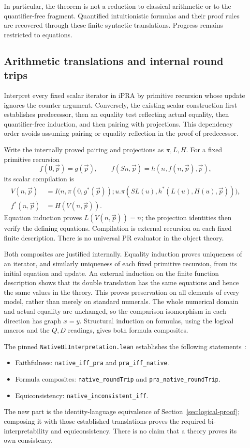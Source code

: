 \documentclass[11pt]{article}
\theoremstyle{definition}
\theoremstyle{remark}
\begin{document}
In particular, the theorem is not a reduction to classical arithmetic
or to the quantifier-free fragment. Quantified intuitionistic formulas
and their proof rules are recovered through these finite syntactic
translations. Progress remains restricted to equations.

\subsection{Arithmetic translations and internal round trips}

Interpret every fixed scalar iterator in iPRA by primitive recursion
whose update ignores the counter argument. Conversely, the existing
scalar construction first establishes predecessor, then an equality
test reflecting actual equality, then quantifier-free induction, and
then pairing with projections. This dependency order avoids assuming
pairing or equality reflection in the proof of predecessor.

Write the internally proved pairing and projections as $\pi,L,H$.
For a fixed primitive recursion
\[
 f(0,\vec p)=g(\vec p),\qquad
 f(Sn,\vec p)=h(n,f(n,\vec p),\vec p),
\]
its scalar compilation is
\begin{align*}
 V(n,\vec p)&=I\bigl(n,\pi(0,g^*(\vec p));
   u.\pi(SL(u),h^*(L(u),H(u),\vec p))\bigr),\\
 f^*(n,\vec p)&=H(V(n,\vec p)).
\end{align*}
Equation induction proves $L(V(n,\vec p))=n$; the projection identities
then verify the defining equations. Compilation is external recursion
on each fixed finite description. There is no universal PR evaluator
in the object theory.

Both composites are justified internally. Equality induction proves
uniqueness of an iterator, and similarly uniqueness of each fixed
primitive recursion, from its initial equation and update. An external
induction on the finite function description shows that its double
translation has the same equations and hence the same values in the
theory. This proves preservation on all elements of every model, rather
than merely on standard numerals. The whole numerical domain and actual
equality are unchanged, so the comparison isomorphism in each direction
has graph $x=y$. Structural induction on formulas, using the logical
macros and the $Q,D$ readings, gives both formula composites.

The pinned \texttt{NativeBiInterpretation.lean} establishes
the following statements~\cite{biinterp}:
\begin{itemize}
\item Faithfulness: \texttt{native\_iff\_pra} and \texttt{pra\_iff\_native}.
\item Formula composites: \texttt{native\_roundTrip} and
      \texttt{pra\_native\_roundTrip}.
\item Equiconsistency: \texttt{native\_inconsistent\_iff}.
\end{itemize}
The new part is the
identity-language equivalence of Section~\ref{sec:logical-proof}; composing
it with those established translations proves the required
bi-interpretability and equiconsistency. There is no claim that a theory
proves its own consistency.
\end{document}

